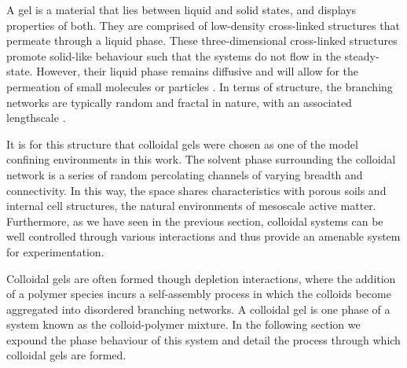 A gel is a material that lies between liquid and solid states, and displays properties of both. They are comprised of low-density cross-linked structures that permeate through a liquid phase. These three-dimensional cross-linked structures promote solid-like behaviour such that the systems do not flow in the steady-state. However, their liquid phase remains diffusive and will allow for the permeation of small molecules or particles \cite{tokita2016}. In terms of structure, the branching networks are typically random and fractal in nature, with an associated lengthscale \cite{zaccarelli2007}. 

It is for this structure that colloidal gels were chosen as one of the model confining environments in this work. The solvent phase surrounding the colloidal network is a series of random percolating channels of varying breadth and connectivity. In this way, the space shares characteristics with porous soils and internal cell structures, the natural environments of mesoscale active matter. Furthermore, as we have seen in the previous section, colloidal systems can be well controlled through various interactions and thus provide an amenable system for experimentation.

Colloidal gels are often formed though depletion interactions, where the addition of a polymer species incurs a self-assembly process in which the colloids become aggregated into disordered branching networks. A colloidal gel is one phase of a system known as the colloid-polymer mixture. In the following section we expound the phase behaviour of this system and detail the process through which colloidal gels are formed.


